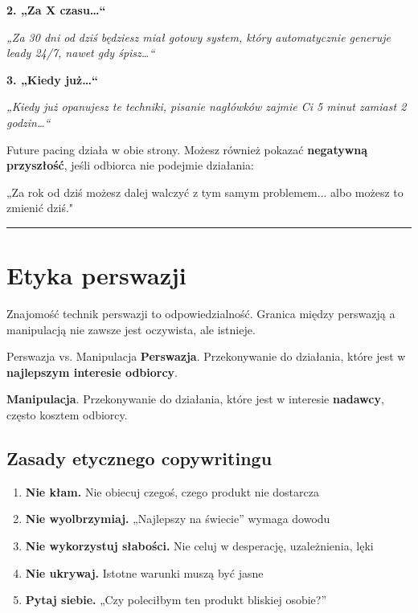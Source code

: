 \documentclass[
  12pt,
  a4paper,
  twoside,
  openright,
  12pt,
  DIV=12,
  BCOR=12mm]{scrbook}
\providecommand{\tightlist}{%
  \setlength{\itemsep}{0pt}\setlength{\parskip}{0pt}}\usepackage{longtable,booktabs,array}
\newcommand{\decoline}{%
  \begin{center}
    \textcolor{bordergray}{\rule{0.3\textwidth}{0.5pt}}
  \end{center}
}
\begin{document}
\textbf{2. „Za X czasu\ldots``}

\emph{„Za 30 dni od dziś będziesz miał gotowy system, który
automatycznie generuje leady 24/7, nawet gdy śpisz\ldots``}

\textbf{3. „Kiedy już\ldots``}

\emph{„Kiedy już opanujesz te techniki, pisanie nagłówków zajmie Ci 5
minut zamiast 2 godzin\ldots``}

\begin{wskazowka}
Future pacing działa w obie strony. Możesz również pokazać \textbf{negatywną przyszłość}, jeśli odbiorca nie podejmie działania:

„Za rok od dziś możesz dalej walczyć z tym samym problemem... albo możesz to zmienić dziś."
\end{wskazowka}

\decoline

\section{Etyka perswazji}\label{etyka-perswazji}

Znajomość technik perswazji to odpowiedzialność. Granica między
perswazją a manipulacją nie zawsze jest oczywista, ale istnieje.

\begin{pojecie}{Perswazja vs. Manipulacja}
\textbf{Perswazja}. Przekonywanie do działania, które jest w \textbf{najlepszym interesie odbiorcy}.

\textbf{Manipulacja}. Przekonywanie do działania, które jest w interesie \textbf{nadawcy}, często kosztem odbiorcy.
\end{pojecie}

\subsection{Zasady etycznego
copywritingu}\label{zasady-etycznego-copywritingu}

\begin{enumerate}
\def\labelenumi{\arabic{enumi}.}
\tightlist
\item
  \textbf{Nie kłam.} Nie obiecuj czegoś, czego produkt nie dostarcza
\item
  \textbf{Nie wyolbrzymiaj.} „Najlepszy na świecie'' wymaga dowodu
\item
  \textbf{Nie wykorzystuj słabości.} Nie celuj w desperację,
  uzależnienia, lęki
\item
  \textbf{Nie ukrywaj.} Istotne warunki muszą być jasne
\item
  \textbf{Pytaj siebie.} „Czy poleciłbym ten produkt bliskiej osobie?''
\end{enumerate}
\end{document}
